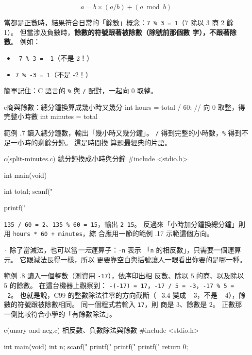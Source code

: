 $$a = b \times (a / b) + (a \bmod{b})$$

當都是正數時，結果符合日常的「餘數」概念：\texttt{7 \% 3 = 1}（7 除以 3
商 2 餘 1）。 但當涉及負數時，\textbf{餘數的符號跟著被除數（除號前那個數
字），不跟著除數}。 例如：
\begin{itemize}
  \item \texttt{-7 \% 3 = -1}（不是 2！）
  \item \texttt{7 \% -3 = 1}（不是 -2！）
\end{itemize}

簡單記住：C 語言的 \texttt{\%} 與 \texttt{/} 配對，一起向 0 取整。

\begin{code}{c}{商與餘數：總分鐘換算成幾小時又幾分}
int hours = total / 60;         // 向 0 取整，得完整小時數
int minutes = total %
\end{code}

範例 \thechapter.7 讀入總分鐘數，輸出「幾小時又幾分鐘」。 \texttt{/}
得到完整的小時數，\texttt{\%} 得到不足一小時的剩餘分鐘。 這是時間換
算題最經典的片語。

\begin{example}{c}{(split-minutes.c) 總分鐘換成小時與分鐘}
#include <stdio.h>

int main(void) {
    int total;
    scanf("%

    printf("%
}
\end{example}


\texttt{135 / 60 = 2}、\texttt{135 \% 60 = 15}，輸出 \texttt{2 15}。
反過來「小時加分鐘換總分鐘」則用 \texttt{hours * 60 + minutes}，綜
合應用一節的範例 \thechapter.17 示範這個方向。

\texttt{-} 除了當減法，也可以當\emph{一元}運算子：\texttt{-n} 表示
「\texttt{n} 的相反數」，只需要一個運算元。 它跟減法長得一樣，所以
更要靠空白與括號讓人一眼看出你要的是哪一種。

範例 \thechapter.8 讀入一個整數（測資用 \texttt{-17}），依序印出相
反數、除以 $5$ 的商、以及除以 $5$ 的餘數。 在這台機器上觀察到：
\texttt{-(-17) = 17}，\texttt{-17 / 5 = -3}，\texttt{-17 \% 5 = -2}。
也就是說，C99 的整數除法往零的方向截斷（$-3.4$ 變成 $-3$，不是
$-4$），餘數的符號跟被除數相同。 同一個程式若輸入 \texttt{17}，則
商是 $3$、餘數是 $2$。 正數那一側比較符合小學的「有餘數除法」。

\begin{example}{c}{(unary-and-neg.c) 相反數、負數除法與餘數}
#include <stdio.h>

int main(void) {
    int n;
    scanf("%
    printf("%
    printf("%
    printf("%
    return 0;
}
\end{example}


